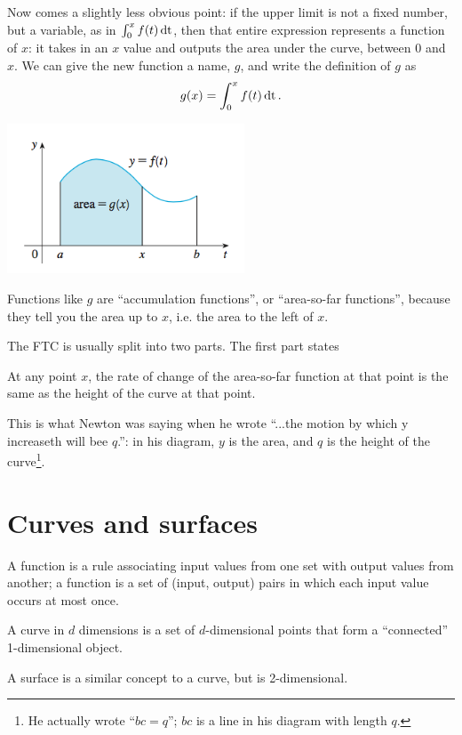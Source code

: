 \documentclass[12pt]{article}
\begin{document}
Now comes a slightly less obvious point: if the upper limit is not a fixed
number, but a variable, as in $\int_0^{x} f(t) \operatorname{\text{dt}}$, then that entire
expression represents a function of $x$: it takes in an $x$ value and outputs
the area under the curve, between 0 and $x$. We can give the new function a
name, $g$, and write the definition of $g$ as
\begin{align*}
  g(x) = \int_0^{x} f(t) \operatorname{\text{dt}}.
\end{align*}

\includegraphics[width=200pt]{img/stewart-ftc-1.png}

Functions like $g$ are ``accumulation functions'', or ``area-so-far
functions'', because they tell you the area up to $x$, i.e. the area to the
left of $x$.

The FTC is usually split into two parts. The first part states\\
\begin{mdframed}
  At any point $x$, the rate of change of the area-so-far function at that
  point is the same as the height of the curve at that point.
\end{mdframed}

This is what Newton was saying when he wrote ``...the motion by which y
increaseth will bee $q$.'': in his diagram, $y$ is the area, and $q$ is the
height of the curve\footnote{He actually wrote ``$bc=q$''; $bc$ is a line in
  his diagram with length $q$.}.

\newpage
\section{Curves and surfaces}

A function is a rule associating input values from one set with output values
from another; a function is a set of (input, output) pairs in which each input
value occurs at most once.

A curve in $d$ dimensions is a set of $d$-dimensional points that form a
``connected'' 1-dimensional object.

A surface is a similar concept to a curve, but is 2-dimensional.
\end{document}
